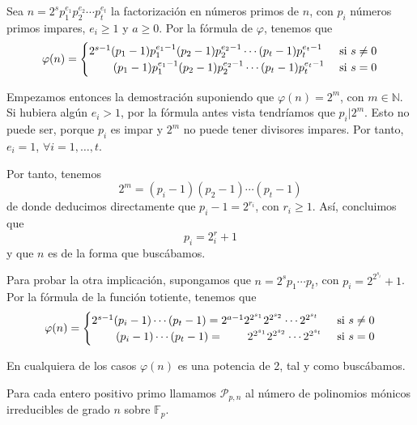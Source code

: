 \documentclass[a4paper, 11pt]{article}
\begin{document}
  \begin{solucion}
      Sea $n = 2^s p_1^{e_1} p_2^{e_2} \cdots p_t^{e_t}$ la factorización en números primos de $n$, con $p_i$ números primos impares, $e_i \geq 1$ y $a \geq 0$. Por la fórmula de $\varphi$, tenemos que
      \[
      \varphi(n) = \begin{cases}
          2^{s-1}(p_1 - 1)p_1^{e_1 - 1} (p_2 - 1)p_2^{e_2 - 1} \cdots (p_t - 1)p_t^{e_t - 1} & \textrm{ si } s \neq 0\\
          \hspace{7.5mm}(p_1 - 1)p_1^{e_1 - 1} (p_2 - 1)p_2^{e_2 - 1} \cdots (p_t - 1)p_t^{e_t - 1} & \textrm{ si } s = 0
      \end{cases}
      \]

      Empezamos entonces la demostración suponiendo que $\varphi(n) = 2^m$, con $m\in\mathbb{N}$. Si hubiera algún $e_i > 1$, por la fórmula antes vista tendríamos que $p_i \vert 2^m$. Esto no puede ser, porque $p_i$ es impar y $2^m$ no puede tener divisores impares. Por tanto, $e_i = 1$, $\forall i = 1, \dots, t$.

      Por tanto, tenemos
      \[
      2^m = (p_i - 1) (p_2 - 1) \cdots (p_t - 1)
      \]
      de donde deducimos directamente que $p_i - 1 = 2^{r_i}$, con $r_i \geq 1$. Así, concluimos que
      \[
      p_i = 2^r_i + 1
      \]
      y que $n$ es de la forma que buscábamos.

      Para probar la otra implicación, supongamos que $n = 2^s p_1 \cdots p_t$, con $p_i = 2^{2^{s_i}} + 1$. Por la fórmula de la función totiente, tenemos que
      \[
        \varphi(n) = \begin{cases}
        2^{s-1} (p_i - 1) \cdots (p_t -1) = 2^{a-1} 2^{2^{s_1}} 2^{2^{s_2}} \cdots 2^{2^{s_t}} & \textrm{ si } s \neq 0\\
        \hspace{7.5mm}(p_i - 1) \cdots (p_t -1) = \hspace{7.5mm}2^{2^{s_1}} 2^{2^{s_2}} \cdots 2^{2^{s_t}} & \textrm{ si } s = 0
    \end{cases}
      \]

      En cualquiera de los casos $\varphi(n)$ es una potencia de 2, tal y como buscábamos.
  \end{solucion}

  \begin{ejercicio}
      Para cada entero positivo primo llamamos $\mathcal{P}_{p,n}$ al número de polinomios mónicos irreducibles de grado $n$ sobre $\mathbb{F}_p$.
  \end{ejercicio}
\end{document}
